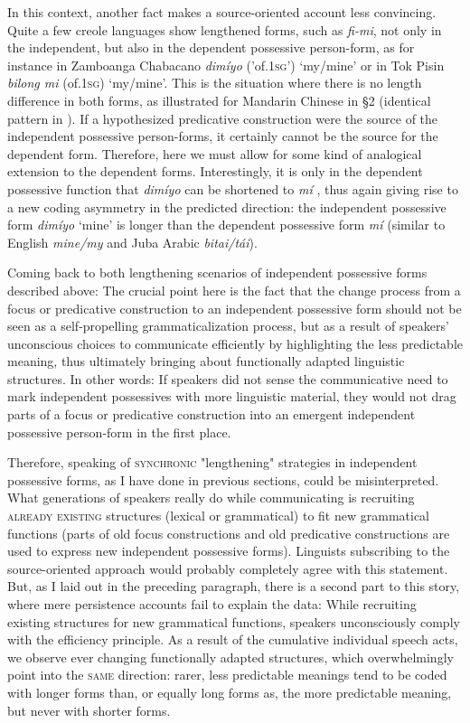 \documentclass[output=paper]{langsci/langscibook}
\begin{document}
In this context, another fact makes a source-oriented account less convincing. Quite a few creole languages show lengthened forms, such as \textit{fi-mi}, not only in the independent, but also in the dependent possessive person-form, as for instance in Zamboanga Chabacano \textit{dimíyo} ('of.1\textsc{sg}') `my/mine' or in Tok Pisin \textit{bilong mi} (of.1\textsc{sg}) `my/mine'. This is the situation where there is no length difference in both forms, as illustrated for Mandarin Chinese in §2 (identical pattern in ). If a hypothesized predicative construction were the source of the independent possessive person-forms, it certainly cannot be the source for the dependent form. Therefore, here we must allow for some kind of analogical extension to the dependent forms. Interestingly, it is only in the dependent possessive function that \textit{dimíyo} can be shortened to \textit{mí} \citep{Steinkrüger2013}, thus again giving rise to a new coding asymmetry in the predicted direction: the independent possessive form \textit{dimíyo} `mine' is longer than the dependent possessive form \textit{mí} (similar to English \textit{mine/my} and Juba Arabic \textit{bitai/tái}).

Coming back to both lengthening scenarios of independent possessive forms described above: The crucial point here is the fact that the change process from a focus or predicative construction to an independent possessive form should not be seen as a self-propelling grammaticalization process, but as a result of speakers' unconscious choices to communicate efficiently by highlighting the less predictable meaning, thus ultimately bringing about functionally adapted linguistic structures. In other words: If speakers did not sense the communicative need to mark independent possessives with more linguistic material, they would not drag parts of a focus or predicative construction into an emergent independent possessive person-form in the first place. 

Therefore, speaking of \textsc{synchronic} "lengthening" strategies in independent possessive forms, as I have done in previous sections, could be misinterpreted. What generations of speakers really do while communicating is recruiting \textsc{already} \textsc{existing} structures (lexical or grammatical) to fit new grammatical functions (parts of old focus constructions and old predicative constructions are used to express new independent possessive forms). Linguists subscribing to the source-oriented approach would probably completely agree with this statement. But, as I laid out in the preceding paragraph, there is a second part to this story, where mere persistence accounts fail to explain the data: While recruiting existing structures for new grammatical functions, speakers unconsciously comply with the efficiency principle. As a result of the cumulative individual speech acts, we observe ever changing functionally adapted structures, which overwhelmingly point into the \textsc{same} direction: rarer, less predictable meanings tend to be coded with longer forms than, or equally long forms as, the more predictable meaning, but never with shorter forms. 
\end{document}

